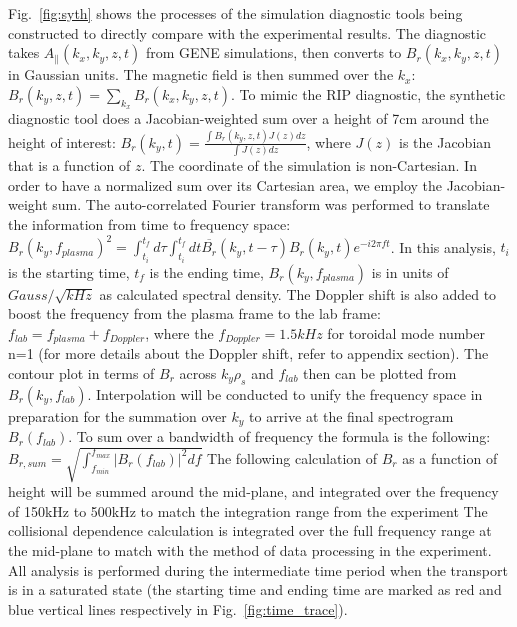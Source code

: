 \documentclass[
 aip,
 amsmath,amssymb,
 reprint
]{revtex4-1}
\begin{document}
Fig.~\ref{fig:syth} shows the processes of the simulation diagnostic tools being constructed to directly compare with the experimental results. The diagnostic takes $A_{\|}(k_x,k_y,z,t)$ from GENE simulations, then converts to $B_r(k_x,k_y,z,t)$ in Gaussian units. 
The magnetic field is then summed over the $k_x$:  $B_r(k_y,z,t)=\sum_{k_x}B_r(k_x,k_y,z,t)$. To mimic the RIP diagnostic, the synthetic diagnostic tool does a Jacobian-weighted sum over a height of 7cm around the height of interest: $B_r(k_y,t)=\frac{\int B_r(k_y,z,t) J(z) dz}{\int J(z) dz}$, where $J(z)$ is the Jacobian that is a function of $z$. The coordinate of the simulation is non-Cartesian. In order to have a normalized sum over its Cartesian area, we employ the Jacobian-weight sum. The auto-correlated Fourier transform was performed to translate the information from time to frequency space:  $B_{r}\left(k_{y}, f_{plasma}\right)^2=\int_{t_i}^{t_f} d \tau \int_{t_i}^{t_f} d t \overline{B_{r}}\left(k_{y}, t-\tau\right) B_{r}\left(k_{y}, t\right) e^{-i 2 \pi f t}$. In this analysis, $t_i$ is the starting time, $t_f$ is the ending time,  $B_{r}\left(k_{y}, f_{plasma}\right)$ is in units of $Gauss/\sqrt{kHz}$ as calculated spectral density. The Doppler shift is also added to boost the frequency from the plasma frame to the lab frame: $f_{lab}=f_{plasma}+ f_{Doppler}$, where the $f_{Doppler}=1.5 kHz$ for toroidal mode number n=1 (for more details about the Doppler shift, refer to appendix section). The contour plot in terms of $B_r$ across $k_y\rho_s$ and $f_{lab}$ then can be plotted from $B_{r}(k_y,f_{lab})$. Interpolation will be conducted to unify the frequency space in preparation for the summation over $k_y$ to arrive at the final spectrogram $B_{r}(f_{lab})$. To sum over a bandwidth of frequency the formula is the following: $B_{r,sum}=\sqrt{\int_{f_{min}}^{f_{max}}|B_r(f_{lab})|^2df}$ The following calculation of $B_r$ as a function of height will be summed around the mid-plane, and integrated over the frequency of 150kHz to 500kHz to match the integration range from the experiment\cite{RIP_Chen_POP_2021}
The collisional dependence calculation is integrated over the full frequency range at the mid-plane to match with the method of data processing in the experiment\cite{RIP_Chen_POP_2020,RIP_Chen_POP_2021}.  All analysis is performed during the intermediate time period when the transport is in a saturated state (the starting time and ending time are marked as red and blue vertical lines respectively in Fig.~\ref{fig:time_trace}).
\end{document}
